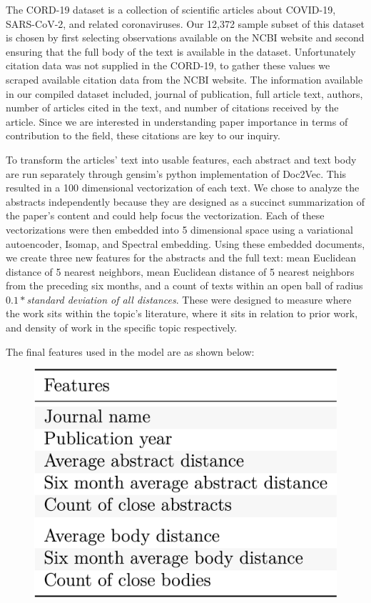 \documentclass{article} %
\begin{document}
The CORD-19 dataset is a collection of scientific articles about COVID-19, SARS-CoV-2, and related coronaviruses. Our 12,372 sample subset of this dataset is chosen by first selecting observations available on the NCBI website and second ensuring that the full body of the text is available in the dataset. Unfortunately citation data was not supplied in the CORD-19, to gather these values we scraped available citation data from the NCBI website. The information available in our compiled dataset included, journal of publication, full article text, authors, number of articles cited in the text, and number of citations received by the article. Since we are interested in understanding paper importance in terms of contribution to the field, these citations are key to our inquiry.

To transform the articles' text into usable features, each abstract and text body are run separately through gensim's python implementation of Doc2Vec. This resulted in a 100 dimensional vectorization of each text. We chose to analyze the abstracts independently because they are designed as a succinct summarization of the paper's content and could help focus the vectorization. Each of these vectorizations were then embedded into 5 dimensional space using a variational autoencoder, Isomap, and Spectral embedding. Using these embedded documents, we create three new features for the abstracts and the full text: mean Euclidean distance of 5 nearest neighbors, mean Euclidean distance of 5 nearest neighbors from the preceding six months, and a count of texts within an open ball of radius $0.1 * $\textit{standard deviation of all distances}. These were designed to measure where the work sits within the topic's literature, where it sits in relation to prior work, and density of work in the specific topic respectively. 

The final features used in the model are as shown below:


\begin{figure}[h]
\begin{center}
\includegraphics[scale=0.17]{../Figures/features.png} 
\end{center}
\end{figure}
\end{document}
